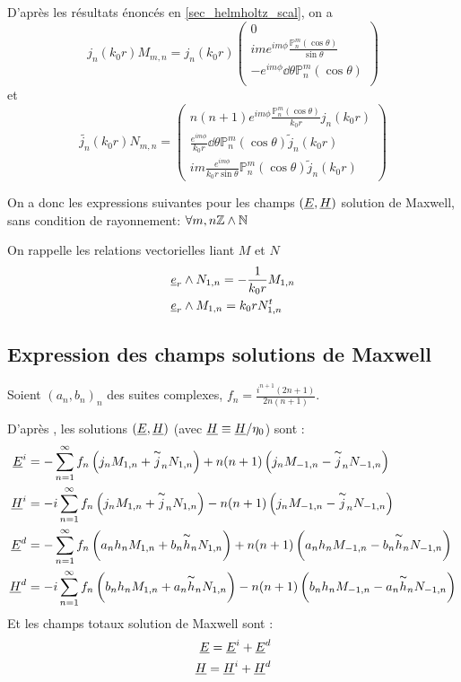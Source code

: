 D'après les résultats énoncés en \ref{sec_helmholtz_scal}, on a
\[
  j_n(k_0r)M_{m,n} = j_n(k_0r)
  \begin{pmatrix}
    0\\
    ime^{im\phi}\frac{\mathbb{P}^m_n(\cos\theta)}{\sin\theta}\\
    -e^{im\phi}\dd{\theta}{\mathbb{P}^m_n(\cos\theta)}\\
  \end{pmatrix}
\]
et 
\[
  \tilde{j_n}(k_0r)N_{m,n}=
    \begin{pmatrix}
    n(n+1)e^{im\phi}\frac{\mathbb{P}^m_n(\cos\theta)}{k_0r}j_n(k_0r)\\
    \frac{e^{im\phi}}{k_0r}\dd{\theta}{\mathbb{P}^m_n(\cos\theta)}\tilde j_n(k_0r)\\
    im\frac{e^{im\phi}}{k_0r\sin\theta}\mathbb{P}^m_n(\cos\theta)\tilde j_n(k_0r)
  \end{pmatrix}
\]

On a donc les expressions suivantes pour les champs $(\underline{E},\underline{H})$ solution de Maxwell, sans condition de rayonnement:
$\forall m,n \mathbb Z\wedge\mathbb N$




On rappelle les relations vectorielles liant $M$ et $N$
\begin{align*}
  &\underline{e}_r \wedge N_{1,n} = -\dfrac{1}{k_0r}M_{1,n} \\
  &\underline{e}_r \wedge M_{1,n} = k_0r N_{1,n}^t
\end{align*}

\subsection{Expression des champs solutions de Maxwell}
Soient $(a_n,b_n)_n$ des suites complexes, $f_n = \frac{i^{n+1}(2n+1)}{2n(n+1)}$.

D’après \cite{morse_methods_1953}, les solutions $(\underline{E},\underline{H})$ (avec $\underline{H} \equiv \underline{H} /\eta_0 $) sont :
\begin{align*}
  \underline{E}^i &= -\sum_{n=1}^\infty f_n \left( j_nM_{1,n} + \overset{\thicksim}{j}_n N_{1,n} \right) + n(n+1)\left(j_n M_{-1,n} - \overset{\thicksim}{j}_nN_{-1,n} \right)\\
  \underline{H}^i &= -i\sum_{n=1}^\infty f_n \left( j_nM_{1,n} + \overset{\thicksim}{j}_nN_{1,n} \right) - n(n+1)\left(j_n M_{-1,n} - \overset{\thicksim}{j}_n N_{-1,n} \right)\\
  \underline{E}^d &= -\sum_{n=1}^\infty f_n \left( a_n h_nM_{1,n} + b_n\overset{\thicksim}{h}_nN_{1,n} \right) + n(n+1)\left(a_nh_nM_{-1,n} - b_n\overset{\thicksim}{h}_nN_{-1,n} \right)\\
  \underline{H}^d &= -i\sum_{n=1}^\infty f_n \left( b_nh_nM_{1,n} + a_n\overset{\thicksim}{h}_nN_{1,n} \right) - n(n+1)\left(b_nh_nM_{-1,n} - a_n\overset{\thicksim}{h}_nN_{-1,n} \right)\\
\end{align*}
Et les champs totaux solution de Maxwell sont : 
\begin{align}
  \underline{E} = \underline{E}^i + \underline{E}^d\label{eq_solEmie}\\
  \underline{H} = \underline{H}^i + \underline{H}^d\label{eq_solHmie}
\end{align}

